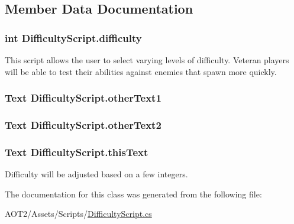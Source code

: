 \subsection{Member Data Documentation}
\hypertarget{class_difficulty_script_a1a931c1e4bc7c3465dc3e6a0bb4ac9d8}{
\subsubsection[{difficulty}]{\setlength{\rightskip}{0pt plus 5cm}int Difficulty\-Script.\-difficulty\hspace{0.3cm}{\ttfamily [static]}}}\label{class_difficulty_script_a1a931c1e4bc7c3465dc3e6a0bb4ac9d8}
This script allows the user to select varying levels of difficulty. Veteran players will be able to test their abilities against enemies that spawn more quickly. \hypertarget{class_difficulty_script_ac35d383f05d94d0388dae2aa9544aeec}{
\subsubsection[{other\-Text1}]{\setlength{\rightskip}{0pt plus 5cm}Text Difficulty\-Script.\-other\-Text1}}\label{class_difficulty_script_ac35d383f05d94d0388dae2aa9544aeec}
\hypertarget{class_difficulty_script_a88e0b2f1fdb864f25e32c7945467befa}{
\subsubsection[{other\-Text2}]{\setlength{\rightskip}{0pt plus 5cm}Text Difficulty\-Script.\-other\-Text2}}\label{class_difficulty_script_a88e0b2f1fdb864f25e32c7945467befa}
\hypertarget{class_difficulty_script_a6cf366e11e24688822b51ad02a591d12}{
\subsubsection[{this\-Text}]{\setlength{\rightskip}{0pt plus 5cm}Text Difficulty\-Script.\-this\-Text}}\label{class_difficulty_script_a6cf366e11e24688822b51ad02a591d12}


Difficulty will be adjusted based on a few integers. 



The documentation for this class was generated from the following file\-:\begin{DoxyCompactItemize}
\item 
A\-O\-T2/\-Assets/\-Scripts/\hyperlink{_difficulty_script_8cs}{Difficulty\-Script.\-cs}\end{DoxyCompactItemize}
